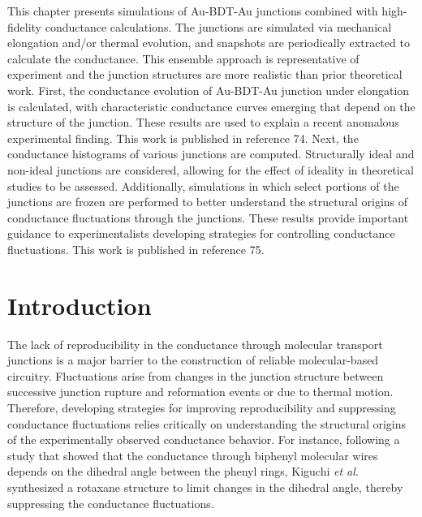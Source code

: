 \documentclass[10pt]{report}  %
\newcommand\findent{\hspace*{\parindent}}
\begin{document}
\findent This chapter presents simulations of Au-BDT-Au junctions combined with high-fidelity conductance calculations. The junctions are simulated via mechanical elongation and/or thermal evolution, and snapshots are periodically extracted to calculate the conductance. This ensemble approach is representative of experiment and the junction structures are more realistic than prior theoretical work. First, the conductance evolution of Au-BDT-Au junction under elongation is calculated, with characteristic conductance curves emerging that depend on the structure of the junction. These results are used to explain a recent anomalous experimental finding. \cite{Bruot:2012} This work is published in reference 74. Next, the conductance histograms of various junctions are computed. Structurally ideal and non-ideal junctions are considered, allowing for the effect of ideality in theoretical studies to be assessed. Additionally, simulations in which select portions of the junctions are frozen are performed to better understand the structural origins of conductance fluctuations through the junctions. These results provide important guidance to experimentalists developing strategies for controlling conductance fluctuations. This work is published in reference 75. 

\section{Introduction}

\findent The lack of reproducibility in the conductance through molecular transport junctions is a major barrier to the construction of reliable molecular-based circuitry. \cite{McCreery:2009,Ulrich:2006} Fluctuations arise from changes in the junction structure between successive junction rupture and reformation events or due to thermal motion. \cite{Malen:2009} Therefore, developing strategies for improving reproducibility and suppressing conductance fluctuations relies critically on understanding the structural origins of the experimentally observed conductance behavior. For instance, following a study \cite{Venkataraman-nature:2006} that showed that the conductance through biphenyl molecular wires depends on the dihedral angle between the phenyl rings, Kiguchi \textit{et al.} \cite{Kiguchi:2012} synthesized a rotaxane structure to limit changes in the dihedral angle, thereby suppressing the conductance fluctuations. 
\end{document}
